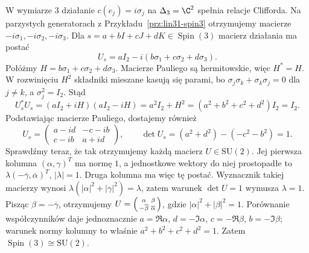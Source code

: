 \begin{przyklad}
\label{prz:lin31-bloch}
W wymiarze $3$ działanie
$c(e_j)=i\sigma_j$ na $\Delta_3=\C^2$
spełnia relacje Clifforda. Na parzystych
generatorach z Przykładu~\ref{prz:lin31-spin3}
otrzymujemy macierze $-i\sigma_1,-i\sigma_2,
-i\sigma_3$. Dla
$s=a+bI+cJ+dK\in\operatorname{Spin}(3)$
macierz działania ma postać
\[
 U_s=aI_2-i(b\sigma_1+c\sigma_2+d\sigma_3).
\]
Połóżmy $H=b\sigma_1+c\sigma_2+d\sigma_3$.
Macierze Pauliego są hermitowskie, więc $H^*=H$.
W rozwinięciu $H^2$ składniki mieszane kasują się parami,
bo $\sigma_j\sigma_k+\sigma_k\sigma_j=0$ dla $j\ne k$,
a $\sigma_j^2=I_2$. Stąd
\[
 U_s^*U_s=(aI_2+iH)(aI_2-iH)
 =a^2I_2+H^2=(a^2+b^2+c^2+d^2)I_2=I_2.
\]
Podstawiając macierze Pauliego, dostajemy również
\[
 U_s=\begin{pmatrix}a-id&-c-ib\\c-ib&a+id\end{pmatrix},
 \qquad
 \det U_s=(a^2+d^2)-(-c^2-b^2)=1.
\]
Sprawdźmy teraz, że tak otrzymujemy każdą macierz $U\in\mathrm{SU}(2)$.
Jej pierwsza kolumna $(\alpha,\gamma)^T$ ma normę $1$,
a jednostkowe wektory do niej prostopadłe to
$\lambda(-\overline\gamma,\overline\alpha)^T$, $|\lambda|=1$.
Druga kolumna ma więc tę postać. Wyznacznik takiej macierzy
wynosi $\lambda(|\alpha|^2+|\gamma|^2)=\lambda$,
zatem warunek $\det U=1$ wymusza $\lambda=1$.
Pisząc $\beta=-\overline\gamma$, otrzymujemy
$U=\begin{psmallmatrix}\alpha&\beta\\
-\overline\beta&\overline\alpha\end{psmallmatrix}$,
gdzie $|\alpha|^2+|\beta|^2=1$.
Porównanie współczynników daje jednoznacznie
$a=\Re\alpha$, $d=-\Im\alpha$,
$c=-\Re\beta$, $b=-\Im\beta$;
warunek normy kolumny to właśnie $a^2+b^2+c^2+d^2=1$.
Zatem $\operatorname{Spin}(3)\cong\mathrm{SU}(2)$.


\end{przyklad}
